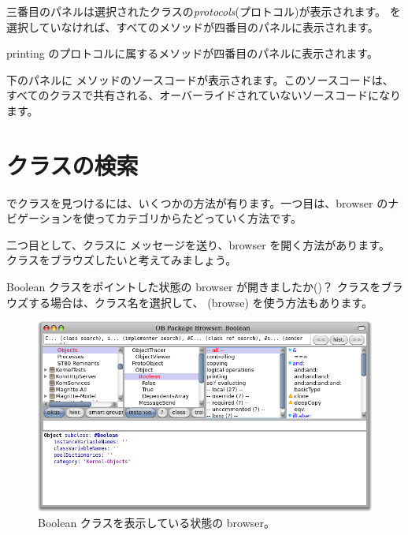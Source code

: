 \documentclass[a4paper,10pt,twoside]{book}
\begin{document}
三番目のパネルは選択されたクラスの\emph{protocols}(プロトコル)が表示されます。
 を選択していなければ、すべてのメソッドが四番目のパネルに表示されます。

printing のプロトコルに属するメソッドが四番目のパネルに表示されます。

下のパネルに メソッドのソースコードが表示されます。このソースコードは、すべてのクラスで共有される、オーバーライドされていないソースコードになります。

\section{クラスの検索}

\pharo でクラスを見つけるには、いくつかの方法が有ります。一つ目は、browser のナビゲーションを使ってカテゴリからたどっていく方法です。

二つ目として、クラスに  メッセージを送り、browser を開く方法があります。 クラスをブラウズしたいと考えてみましょう。

Boolean クラスをポイントした状態の browser が開きましたか()？
クラスをブラウズする場合は、クラス名を選択して、  (browse) を使う方法もあります。


\begin{figure}[hbt]
\centerline {\includegraphics[width=\textwidth]{Kernel-objects-boolean}}
\caption{Boolean クラスを表示している状態の browser。
}
\end{figure}
\end{document}
